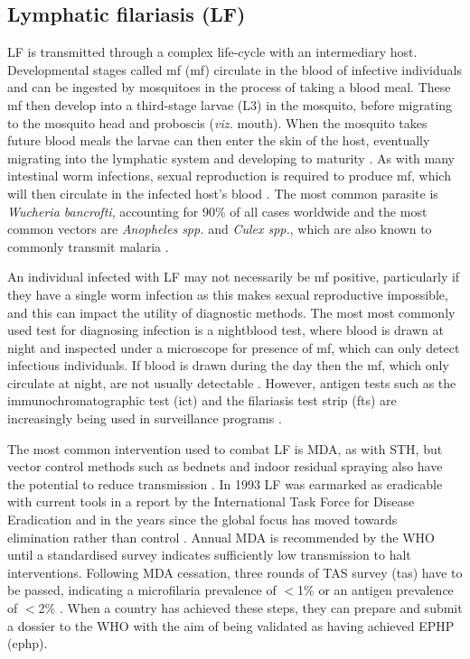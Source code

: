 \subsection{Lymphatic filariasis (LF)}

LF is transmitted through a complex life-cycle with an intermediary host. Developmental stages called \acrlong{mf} (mf) circulate in the blood of infective individuals and can be ingested by mosquitoes in the process of taking a blood meal. These mf then develop into a third-stage larvae (\gls{L3}) in the mosquito, before migrating to the mosquito head and proboscis (\textit{viz.} mouth). When the mosquito takes future blood meals the larvae can then enter the skin of the host, eventually migrating into the lymphatic system and developing to maturity \cite{WHOLF}. As with many intestinal worm infections, sexual reproduction is required to produce mf, which will then circulate in the infected host's blood \cite{WHO2019_FactSheet,Anderson1992}. The most common parasite is \textit{Wucheria bancrofti}, accounting for 90\% of all cases worldwide and the most common vectors are \textit{Anopheles spp.} and \textit{Culex spp.}, which are also known to commonly transmit malaria \cite{WHO2019_FactSheet}.

An individual infected with LF may not necessarily be mf positive, particularly if they have a single worm infection as this makes sexual reproductive impossible, and this can impact the utility of diagnostic methods. The most most commonly used test for diagnosing infection is a \gls{nightblood} test, where blood is drawn at night and inspected under a microscope for presence of mf, which can only detect infectious individuals. If blood is drawn during the day then the mf, which only circulate at night, are not usually detectable \cite{WHO2019_FactSheet}. However, antigen tests such as the immunochromatographic test (\acrshort{ict}) and the filariasis test strip (\acrshort{fts}) are increasingly being used in surveillance programs \cite{weil1997,Chesnais2016}. 

The most common intervention used to combat LF is MDA, as with STH, but vector control methods such as bednets and indoor residual spraying also have the potential to reduce transmission \cite{WHO2017_GPELF,rebollo2015}. In 1993 LF was earmarked as eradicable with current tools in a report by the International Task Force for Disease Eradication and in the years since the global focus has moved towards elimination rather than control \cite{WHO2017_GPELF}. Annual MDA is recommended by the WHO until a standardised survey indicates sufficiently low transmission to halt interventions. Following MDA cessation, three rounds of \gls{TAS} survey (\acrshort{tas}) have to be passed, indicating a microfilaria prevalence of $<$1\% or an antigen prevalence of $<$2\% \cite{WHO2017_Validation}. When a country has achieved these steps, they can prepare and submit a dossier to the WHO with the aim of being validated as having achieved \gls{EPHP} (\acrshort{ephp}).

